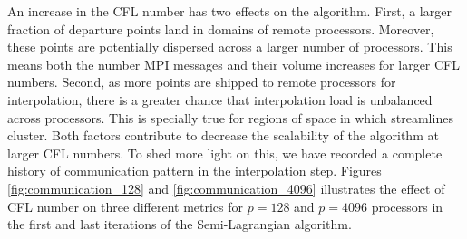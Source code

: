 An increase in the CFL number has two effects on the algorithm. First, a larger fraction of departure points land in domains of remote processors. Moreover, these points are potentially dispersed across a larger number of processors. This means both the number MPI messages and their volume increases for larger CFL numbers. Second, as more points are shipped to remote processors for interpolation, there is a greater chance that interpolation load is unbalanced across processors. This is specially true for regions of space in which streamlines cluster. Both factors contribute to decrease the scalability of the algorithm at larger CFL numbers. To shed more light on this, we have recorded a complete history of communication pattern in the interpolation step. Figures \ref{fig:communication_128} and \ref{fig:communication_4096} illustrates the effect of CFL number on three different metrics for $p= 128$ and $p=4096$ processors in the first and last iterations of the Semi-Lagrangian algorithm. 
